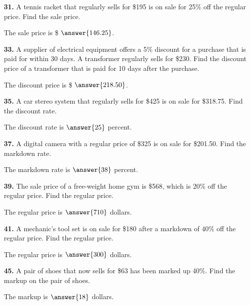 \documentclass{ximera}
\begin{document}
\begin{problem}
\textbf{31.} A tennis racket that regularly sells for \$195 is on sale for 25\% off the
  regular price. Find the sale price.

The sale price is \$ $\answer{146.25}$.
\end{problem}

\begin{problem}
\textbf{33.} A supplier of electrical equipment offers a 5\% discount for a purchase that is
  paid for within 30 days. A transformer regularly sells for \$230. Find the discount
  price of a transformer that is paid for 10 days after the purchase.

The discount price is \$ $\answer{218.50}$.
\end{problem}

\begin{problem}
\textbf{35.} A car stereo system that regularly sells for \$425 is on sale for \$318.75. Find
  the discount rate.

The discount rate is $\answer{25}$ percent.
\end{problem}

\begin{problem}
\textbf{37.} A digital camera with a regular price of \$325 is on sale for \$201.50. Find the
  markdown rate.

The markdown rate is $\answer{38}$ percent.
\end{problem}

\begin{problem}
\textbf{39.} The sale price of a free-weight home gym is \$568, which is 20\% off the regular
  price. Find the regular price.

The regular price is $\answer{710}$ dollars.
\end{problem}

\begin{problem}
\textbf{41.} A mechanic's tool set is on sale for \$180 after a markdown of 40\% off the
  regular price. Find the regular price.

The regular price is $\answer{300}$ dollars.
\end{problem}

\begin{problem}
\textbf{45.} A pair of shoes that now sells for \$63 has been marked up 40\%. Find the markup
  on the pair of shoes.

The markup is $\answer{18}$ dollars.
\end{problem}
\end{document}
